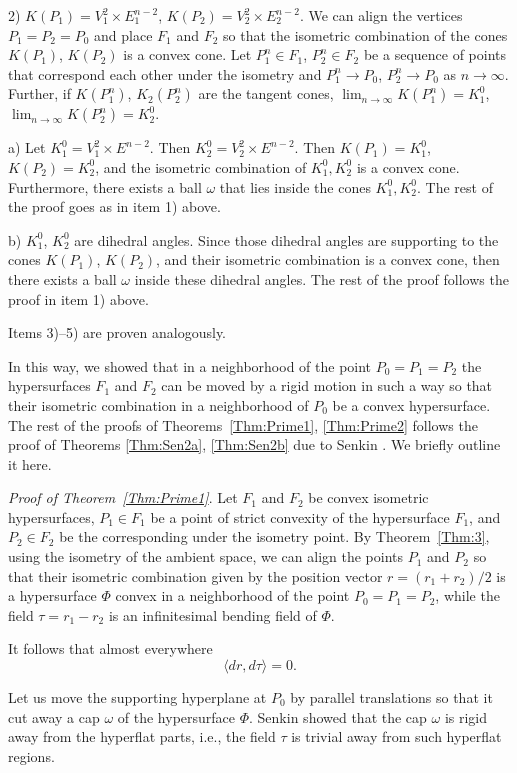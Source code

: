 \documentclass[11pt,oneside]{amsart}
\theoremstyle{theorem}
\theoremstyle{definition}
\theoremstyle{remark}
\begin{document}
2) $K(P_1) = V_1^2 \times E_1^{n-2}$, $K(P_2) = V_2^2 \times E_2^{n-2}$. We can align the vertices $P_1 = P_2 = P_0$ and place $F_1$ and $F_2$ so that the isometric combination of the cones $K(P_1)$, $K(P_2)$ is a convex cone. Let $P_1^n \in F_1$, $P_2^n \in F_2$ be a sequence of points that correspond each other under the isometry and $P_1^n \to P_0$, $P_2^n \to P_0$ as $n \to \infty$.
Further, if $K(P_1^n)$, $K_2(P_2^n)$ are the tangent cones, $\lim_{n\to \infty} K(P_1^n) = K_1^0$, $\lim_{n\to \infty} K(P_2^n) = K_2^0$.

a) Let $K_1^0 = V_1^2 \times E^{n-2}$. Then $K_2^0 = V_2^2 \times E^{n-2}$. Then $K(P_1) = K_1^0$, $K(P_2) = K_2^0$, and the isometric combination of $K_1^0, K_2^0$ is a convex cone. Furthermore, there exists a ball $\omega$ that lies inside the cones $K_1^0, K_2^0$. The rest of the proof goes as in item 1) above.

b) $K_1^0$, $K_2^0$ are dihedral angles. Since those dihedral angles are supporting to the cones $K(P_1)$, $K(P_2)$, and their isometric combination is a convex cone, then there exists a ball $\omega$ inside these dihedral angles. The rest of the proof follows the proof in item 1) above.

Items 3)--5) are proven analogously.  

In this way, we showed that in a neighborhood of the point $P_0 = P_1 = P_2$ the hypersurfaces $F_1$ and $F_2$ can be moved by a rigid motion in such a way so that their isometric combination in a neighborhood of $P_0$ be a convex hypersurface. The rest of the proofs of Theorems~\ref{Thm:Prime1}, \ref{Thm:Prime2} follows the proof of Theorems \ref{Thm:Sen2a}, \ref{Thm:Sen2b} due to Senkin \cite{Sen, Sen2}. We briefly outline it here.

\textit{Proof of Theorem~\ref{Thm:Prime1}}. Let $F_1$ and $F_2$ be convex isometric hypersurfaces, $P_1 \in F_1$ be a point of strict convexity of the hypersurface $F_1$, and $P_2 \in F_2$ be the corresponding under the isometry point. By Theorem~\ref{Thm:3}, using the isometry of the ambient space, we can align the points $P_1$ and $P_2$ so that their isometric combination given by the position vector $r = (r_1 + r_2)/2$ is a hypersurface $\Phi$ convex in a neighborhood of the point $P_0 = P_1 = P_2$, while the field $\tau = r_1 - r_2$ is an infinitesimal bending field of $\Phi$.  

It follows that almost everywhere 
\[
\langle dr, d\tau \rangle = 0.
\] 

Let us move the supporting hyperplane at $P_0$ by parallel translations so that it cut away a cap $\omega$ of the hypersurface $\Phi$. Senkin \cite{Sen} showed that the cap $\omega$ is rigid away from the hyperflat parts, i.e., the field $\tau$ is trivial away from such hyperflat regions.
\end{document}

